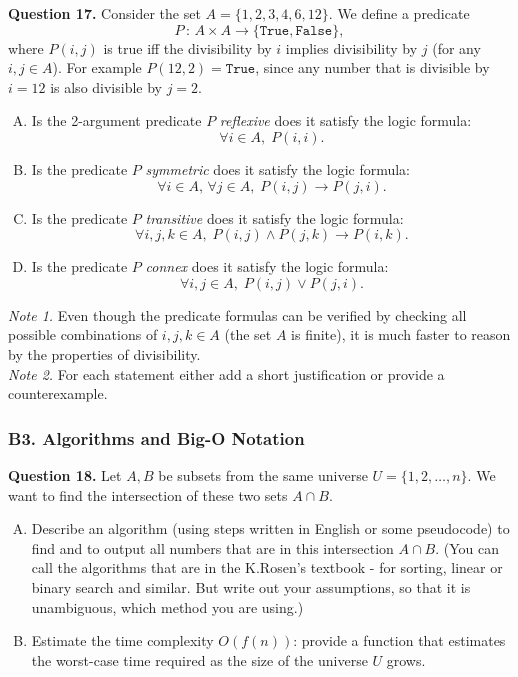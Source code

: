 \documentclass[jou]{apa6}
\begin{document}
\vspace{6pt}
{\bf Question 17.} 
Consider the set $A = \{ 1,2,3,4,6,12 \}$. We define a
predicate 
$$P \,:\, A \times A \rightarrow \{ \mathtt{True}, \mathtt{False} \},$$
where $P(i,j)$ is true iff the divisibility by $i$ implies 
divisibility by $j$ (for any $i,j \in A$). 
For example $P(12,2) = \mathtt{True}$, since any number 
that is divisible by $i = 12$ is also divisible by $j=2$. 

\begin{enumerate}[(A)]
\item Is the 2-argument predicate $P$ {\em reflexive} \textendash{}
does it satisfy the logic formula:
$$\forall i \in A,\;P(i,i).$$
\item Is the predicate $P$ {\em symmetric} \textendash{}
does it satisfy the logic formula:
$$\forall i \in A,\,\forall j \in A,\;P(i,j) \rightarrow P(j,i).$$
\item Is the predicate $P$ {\em transitive} \textendash{}
does it satisfy the logic formula:
$$\forall i,j,k \in A,\;P(i,j) \wedge P(j,k) \rightarrow P(i,k).$$
\item Is the predicate $P$ {\em connex} \textendash{}
does it satisfy the logic formula:
$$\forall i,j \in A,\;P(i,j) \vee P(j,i).$$
\end{enumerate}

{\em Note 1.} Even though the predicate formulas can be verified
by checking all possible combinations of $i,j,k \in A$ (the set $A$ is finite), 
it is much faster to reason by the properties of divisibility.\\
{\em Note 2.} For each statement either add a short justification or provide
a counterexample.






\subsubsection{B3. Algorithms and Big-O Notation} 

{\bf Question 18.} Let $A,B$ be subsets from the same universe $U = \{ 1,2,\ldots,n \}$. 
We want to find the intersection of these two sets $A \cap B$. 

\begin{enumerate}[(A)]
\item Describe an algorithm (using steps written in English or some pseudocode) 
to find and to output all numbers that are in this intersection $A \cap B$. 
(You can call the algorithms that are in the K.Rosen's textbook - for sorting, 
linear or binary search and similar. But write out your assumptions, so that it is unambiguous, 
which method you are using.)
\item Estimate the time complexity $O(f(n))$: provide a function that estimates the 
worst-case time required as the size of the universe $U$ grows.
\end{enumerate}
\end{document}
